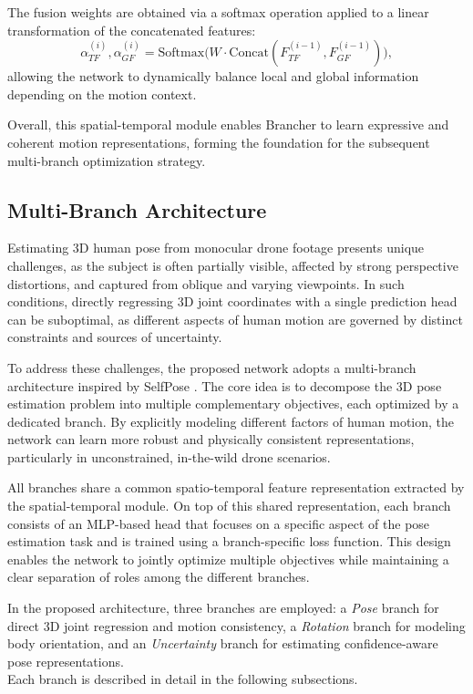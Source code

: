 The fusion weights are obtained via a softmax operation applied to a linear transformation of the concatenated features:
\begin{equation}
    \alpha_{TF}^{(i)}, \alpha_{GF}^{(i)} = \text{Softmax}\bigl(W \cdot \text{Concat}(F_{TF}^{(i-1)}, F_{GF}^{(i-1)})\bigr),
\end{equation}
allowing the network to dynamically balance local and global information depending on the motion context.

Overall, this spatial-temporal module enables Brancher to learn expressive and coherent motion representations, forming the foundation for the subsequent multi-branch optimization strategy.


\subsection{Multi-Branch Architecture}
Estimating 3D human pose from monocular drone footage presents unique challenges, as the subject is often partially visible, affected by strong perspective distortions, and captured from oblique and varying viewpoints.
In such conditions, directly regressing 3D joint coordinates with a single prediction head can be suboptimal, as different aspects of human motion are governed by distinct constraints and sources of uncertainty.

To address these challenges, the proposed network adopts a multi-branch architecture inspired by SelfPose \cite{tome2020selfpose}.
The core idea is to decompose the 3D pose estimation problem into multiple complementary objectives, each optimized by a dedicated branch.
By explicitly modeling different factors of human motion, the network can learn more robust and physically consistent representations, particularly in unconstrained, in-the-wild drone scenarios.

All branches share a common spatio-temporal feature representation extracted by the spatial-temporal module.
On top of this shared representation, each branch consists of an MLP-based head that focuses on a specific aspect of the pose estimation task and is trained using a branch-specific loss function.
This design enables the network to jointly optimize multiple objectives while maintaining a clear separation of roles among the different branches.

In the proposed architecture, three branches are employed: a \textit{Pose} branch for direct 3D joint regression and motion consistency, a \textit{Rotation} branch for modeling body orientation, and an \textit{Uncertainty} branch 
for estimating confidence-aware pose representations.\\
Each branch is described in detail in the following subsections.

